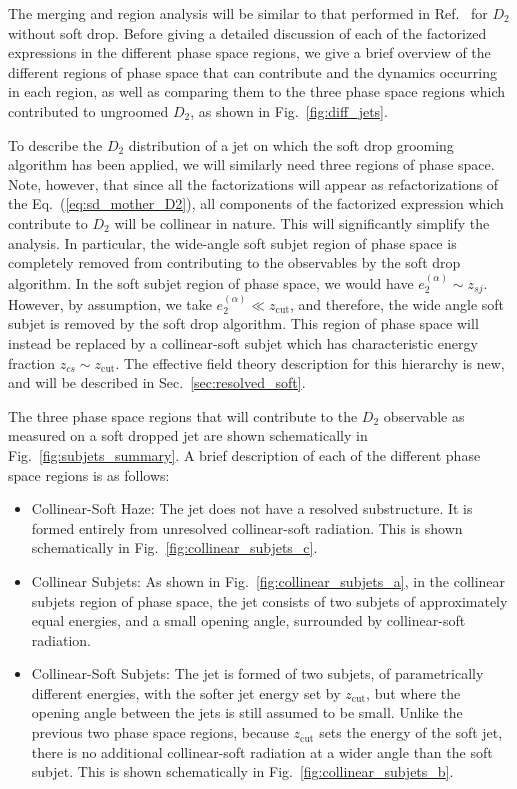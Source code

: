 \documentclass[a4paper,11pt]{article}
\newcommand{\ecf}[2]{e_{#1}^{(#2)}}
\def\zcut{z_{\text{cut}}}
\DeclareRobustCommand{\Sec}[1]{Sec.~\ref{#1}}
\DeclareRobustCommand{\Fig}[1]{Fig.~\ref{#1}}
\DeclareRobustCommand{\Eq}[1]{Eq.~(\ref{#1})}
\DeclareRobustCommand{\Ref}[1]{Ref.~\cite{#1}}
\begin{document}
 The merging and region analysis will be similar to that performed in \Ref{Larkoski:2015kga} for $D_2$ without soft drop. Before giving a detailed discussion of each of the factorized expressions in the different phase space regions, we give a brief overview of the different regions of phase space that can contribute and the dynamics occurring in each region, as well as comparing them to the three phase space regions which contributed to ungroomed $D_2$, as shown in \Fig{fig:diff_jets}.

To describe the $D_2$ distribution of a jet on which the soft drop grooming algorithm has been applied, we will similarly need three regions of phase space. Note, however, that since all the factorizations will appear as refactorizations of the \Eq{eq:sd_mother_D2}, all components of the factorized expression which contribute to $D_2$ will be collinear in nature. This will significantly simplify the analysis. In particular, the wide-angle soft subjet region of phase space is completely removed from contributing to the observables by the soft drop algorithm. In the soft subjet region of phase space, we would have $\ecf{2}{\alpha}\sim z_{sj}$. However, by assumption, we take $\ecf{2}{\alpha}\ll \zcut$, and therefore, the wide angle soft subjet is removed by the soft drop algorithm. This region of phase space will instead be replaced by a collinear-soft subjet which has characteristic energy fraction $z_{cs}\sim \zcut$. The effective field theory description for this hierarchy is new, and will be described in \Sec{sec:resolved_soft}.

The three phase space regions that will contribute to the $D_2$ observable as measured on a soft dropped jet are shown schematically in \Fig{fig:subjets_summary}. A brief description of each of the different phase space regions is as follows:
\begin{itemize}

\item Collinear-Soft Haze: The jet does not have a resolved substructure. It is formed entirely from unresolved collinear-soft radiation. This is shown schematically in \Fig{fig:collinear_subjets_c}.


\item Collinear Subjets: As shown in \Fig{fig:collinear_subjets_a}, in the collinear subjets region of phase space, the jet consists of two subjets of approximately equal energies, and a small opening angle, surrounded by collinear-soft radiation.

\item Collinear-Soft Subjets: The jet is formed of two subjets, of parametrically different energies, with the softer jet energy set by $\zcut$, but where the opening angle between the jets is still assumed to be small. Unlike the previous two phase space regions, because $\zcut$ sets the energy of the soft jet, there is no additional collinear-soft radiation at a wider angle than the soft subjet. This is shown schematically in \Fig{fig:collinear_subjets_b}.


\end{itemize}
\end{document}
